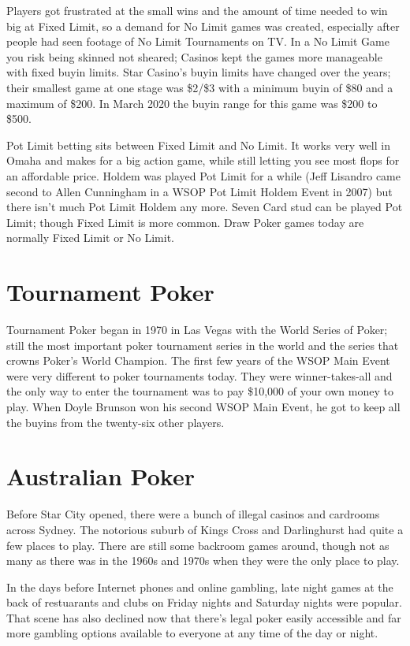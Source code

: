 
Players got frustrated at the small wins and the amount of time needed
to win big at Fixed Limit, so a demand for No Limit games was created,
especially after people had seen footage of No Limit Tournaments on TV.
In a No Limit Game you risk being skinned not sheared; Casinos kept
the games more manageable with fixed buyin limits. Star Casino's buyin limits
have changed over the years; their smallest game at one stage was
\$2/\$3 with a minimum buyin of \$80 and a maximum of \$200. In March 2020
the buyin range for this game was \$200 to \$500.

Pot Limit betting sits between Fixed Limit and No Limit. It works very
well in Omaha and makes for a big action game, while still letting you
see most flops for an affordable price. Holdem was played Pot Limit for
a while (Jeff Lisandro came second to Allen Cunningham in a WSOP Pot Limit
Holdem Event in 2007) but there isn't much Pot Limit Holdem any more.
Seven Card stud can be played Pot Limit; though Fixed Limit
is more common. Draw Poker games today are normally Fixed Limit or No Limit.

\section{Tournament Poker}

Tournament Poker began in 1970 in Las Vegas with the World Series of
Poker; still the most important poker tournament series in the world
and the series that crowns Poker's World Champion. The first few years
of the WSOP Main Event were very different to poker tournaments today.
They were winner-takes-all and the only way to enter the
tournament was to pay \$10,000 of your own money to play.
When Doyle Brunson won his second WSOP Main Event, he got to keep
all the buyins from the twenty-six other players.

\section{Australian Poker}

Before Star City opened, there were a bunch of illegal casinos and
cardrooms across Sydney. The notorious suburb of Kings Cross and
Darlinghurst had quite a few places to play. There are still some
backroom games around, though not as many as there was in
the 1960s and 1970s when they were the only place to play.

In the days before Internet phones and online gambling, late night
games at the back of restuarants and clubs on Friday nights and
Saturday nights were popular. That scene has also declined now that
there's legal poker easily accessible and far more gambling options
available to everyone at any time of the day or night.


